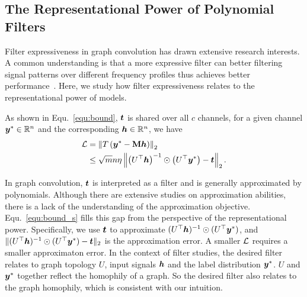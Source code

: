 \documentclass{article} %
\begin{document}
	\subsection{The Representational Power of Polynomial Filters}
	Filter expressiveness in graph convolution has drawn extensive research interests.
	A common understanding is that a more expressive filter can better filtering signal patterns over different frequency profiles thus achieves better performance~\citep{chien2021adaptive,he2021bernnet,JacobiConv,yang2022spectrum,bo2022specformer}.
	Here, we study how filter expressiveness relates to the representational power of models.
	
	As shown in Equ.~\ref{equ:bound}, ${\bm{t}}$ is shared over all $c$ channels, for a given channel ${\bm{y}}^*\in{\mathbb{R}}^n$ and the corresponding ${\bm{h}}\in{\mathbb{R}}^n$, we have
	\begin{equation}
		\label{equ:bound_s}
		\begin{aligned}
			{\mathcal{L}}&=\left\|T\left({\bm{y}}^*-{\mathbf{M}}{\bm{h}}\right)\right\|_2\\
			&\leq\sqrt{m}n\eta\left\|\left(U^{\top}{\bm{h}}\right)^{-1}\odot\left(U^{\top}{\bm{y}}^*\right)-{\bm{t}}\right\|_2.
		\end{aligned}
	\end{equation}
	
	In graph convolution, ${\bm{t}}$ is interpreted as a filter and is generally approximated by polynomials.
	Although there are extensive studies on approximation abilities, there is a lack of the understanding of the approximation objective.
	Equ.~\ref{equ:bound_s} fills this gap from the perspective of the representational power.
	Specifically, we use ${\bm{t}}$ to approximate $(U^{\top}{\bm{h}})^{-1}\odot(U^{\top}{\bm{y}}^*)$, and $\|(U^{\top}{\bm{h}})^{-1}\odot(U^{\top}{\bm{y}}^*)-{\bm{t}}\|_2$ is the approximation error.
	A smaller ${\mathcal{L}}$ requires a smaller approximaton error.
	In the context of filter studies, the desired filter relates to graph topology $U$, input signals ${\bm{h}}$ and the label distribution ${\bm{y}}^*$.
	$U$ and ${\bm{y}}^*$ together reflect the homophily of a graph.
	So the desired filter also relates to the graph homophily, which is consistent with our intuition.
	
\end{document}
